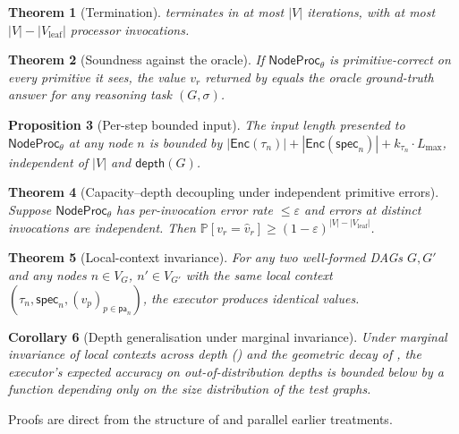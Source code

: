 \documentclass[11pt,a4paper]{article}
\theoremstyle{plain}
\newtheorem{theorem}{Theorem}[section]
\newtheorem{proposition}[theorem]{Proposition}
\newtheorem{corollary}[theorem]{Corollary}
\theoremstyle{definition}
\theoremstyle{remark}
\newcommand{\Spec}{\mathsf{spec}}
\newcommand{\Parents}{\mathsf{pa}}
\newcommand{\dep}{\mathsf{depth}}
\newcommand{\NodeProc}{\mathsf{NodeProc}}
\newcommand{\Prob}{\mathbb{P}}
\newcommand{\eps}{\varepsilon}
\begin{document}
\begin{theorem}[Termination]
\label{thm:executor-termination}
 terminates in at most $|V|$ iterations, with at most $|V| - |V_{\mathrm{leaf}}|$ processor invocations.
\end{theorem}

\begin{theorem}[Soundness against the oracle]
\label{thm:executor-soundness}
If $\NodeProc_\theta$ is primitive-correct on every primitive it sees, the value $v_r$ returned by  equals the oracle ground-truth answer for any reasoning task $(G, \sigma)$.
\end{theorem}

\begin{proposition}[Per-step bounded input]
\label{prop:executor-bounded}
The input length presented to $\NodeProc_\theta$ at any node $n$ is bounded by $|\mathsf{Enc}(\tau_n)| + |\mathsf{Enc}(\Spec_n)| + k_{\tau_n} \cdot L_{\max}$, independent of $|V|$ and $\dep(G)$.
\end{proposition}

\begin{theorem}[Capacity--depth decoupling under independent primitive errors]
\label{thm:executor-decoupling}
Suppose $\NodeProc_\theta$ has per-invocation error rate $\le \eps$ and errors at distinct invocations are independent. Then $\Prob[v_r = \hat{v}_r] \ge (1-\eps)^{|V| - |V_{\mathrm{leaf}}|}$.
\end{theorem}

\begin{theorem}[Local-context invariance]
\label{thm:executor-local-context}
For any two well-formed DAGs $G, G'$ and any nodes $n \in V_G$, $n' \in V_{G'}$ with the same local context $(\tau_n, \Spec_n, (v_p)_{p \in \Parents_n})$, the executor produces identical values.
\end{theorem}

\begin{corollary}[Depth generalisation under marginal invariance]
\label{cor:ood-accuracy}
Under marginal invariance of local contexts across depth () and the geometric decay of , the executor's expected accuracy on out-of-distribution depths is bounded below by a function depending only on the size distribution of the test graphs.
\end{corollary}

Proofs are direct from the structure of  and parallel earlier treatments.
\end{document}
